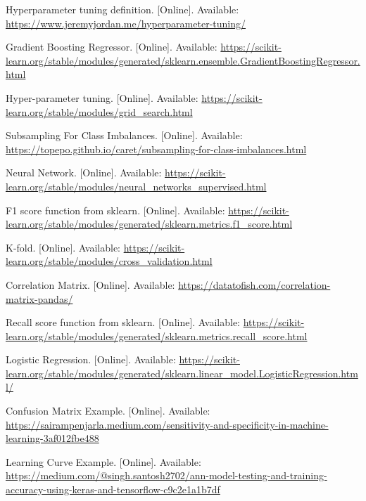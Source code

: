 \documentclass[conference]{IEEEtran}
\begin{document}
\begin{thebibliography}{99}
 Hyperparameter tuning definition. [Online]. Available: \url{https://www.jeremyjordan.me/hyperparameter-tuning/}

 Gradient Boosting Regressor. [Online]. Available: \url{https://scikit-learn.org/stable/modules/generated/sklearn.ensemble.GradientBoostingRegressor.html}

 Hyper-parameter tuning. [Online]. Available: \url{https://scikit-learn.org/stable/modules/grid_search.html}

 Subsampling For Class Imbalances. [Online]. Available: \url{https://topepo.github.io/caret/subsampling-for-class-imbalances.html}

 Neural Network. [Online]. Available: \url{https://scikit-learn.org/stable/modules/neural_networks_supervised.html}

 F1 score function from sklearn. [Online]. Available: \url{https://scikit-learn.org/stable/modules/generated/sklearn.metrics.f1_score.html}

 K-fold. [Online]. Available: \url{https://scikit-learn.org/stable/modules/cross_validation.html}

 Correlation Matrix. [Online]. Available: \url{https://datatofish.com/correlation-matrix-pandas/}

 Recall score function from sklearn. [Online]. Available: \url{https://scikit-learn.org/stable/modules/generated/sklearn.metrics.recall_score.html}

 Logistic Regression. [Online]. Available: \url{https://scikit-learn.org/stable/modules/generated/sklearn.linear_model.LogisticRegression.html/}

 Confusion Matrix Example. [Online]. Available: \url{https://sairampenjarla.medium.com/sensitivity-and-specificity-in-machine-learning-3af012fbe488}

 Learning Curve Example. [Online]. Available: \url{https://medium.com/@singh.santosh2702/ann-model-testing-and-training-accuracy-using-keras-and-tensorflow-c9c2e1a1b7df}

\end{thebibliography}
\end{document}
